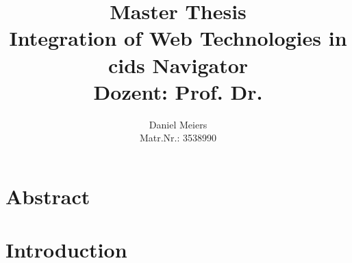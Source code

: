 

\title{%
\large Master Thesis\\
{\LARGE Integration of Web Technologies in cids Navigator}\\[10mm]
Dozent: Prof. Dr. }

\author{%
Daniel Meiers\\
Matr.Nr.: 3538990\\[5mm]
}



\maketitle
 
\tableofcontents
\listoffigures

\chapter{Abstract}
\chapter{Introduction}



\printbibliography


